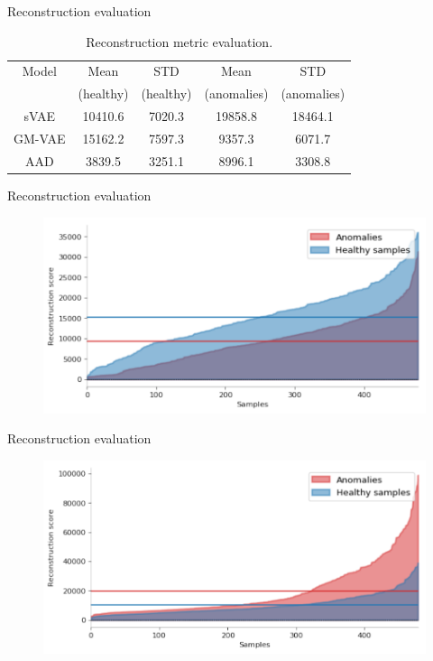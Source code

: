 \documentclass[15pt]{beamer} %
\begin{document}
\begin{frame}{Reconstruction evaluation}
 \begin{table}
    \centering
    \caption[Reconstruction metric evaluation]{Reconstruction metric evaluation.}
    \begin{tabular}{ c c c c c }
        \hline
        Model & Mean & STD & Mean & STD \\
        & (healthy) & (healthy) & (anomalies) & (anomalies) \\
        \hline
        sVAE & 10410.6 & 7020.3 & 19858.8 & 18464.1 \\
        GM-VAE & 15162.2 & 7597.3 & 9357.3 & 6071.7 \\
        AAD & 3839.5 & 3251.1 & 8996.1 & 3308.8 \\
        \hline
    \end{tabular}
\end{table}
\end{frame}


\begin{frame}{Reconstruction evaluation}
 \begin{figure}
   \centering
   \includegraphics[width=.85\textwidth]{rec_gmvae_eval}
  \end{figure}
\end{frame}

\begin{frame}{Reconstruction evaluation}
 \begin{figure}
   \centering
   \includegraphics[width=.85\textwidth]{rec_svae_eval}
  \end{figure}
\end{frame}
\end{document}
